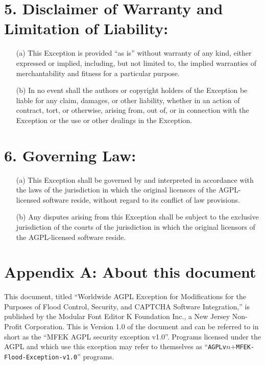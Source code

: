 \documentclass[12pt]{article}
\begin{document}
\section*{5. Disclaimer of Warranty and Limitation of Liability:}
\begin{enumerate}
\item[(a)] This Exception is provided ``as is'' without warranty of any kind, either expressed or implied, including, but not limited to, the implied warranties of merchantability and fitness for a particular purpose.

\item[(b)] In no event shall the authors or copyright holders of the Exception be liable for any claim, damages, or other liability, whether in an action of contract, tort, or otherwise, arising from, out of, or in connection with the Exception or the use or other dealings in the Exception.
\end{enumerate}

\section*{6. Governing Law:}
\begin{enumerate}
\item[(a)] This Exception shall be governed by and interpreted in accordance with the laws of the jurisdiction in which the original licensors of the AGPL-licensed software reside, without regard to its conflict of law provisions.

\item[(b)] Any disputes arising from this Exception shall be subject to the exclusive jurisdiction of the courts of the jurisdiction in which the original licensors of the AGPL-licensed software reside.
\end{enumerate}

\section*{Appendix A: About this document}
This document, titled ``Worldwide AGPL Exception for Modifications for the Purposes of Flood Control, Security, and CAPTCHA Software Integration,'' is published by the Modular Font Editor K Foundation Inc., a New Jersey Non-Profit Corporation. This is Version 1.0 of the document and can be referred to in short as the ``MFEK AGPL security exception v1.0''. Programs licensed under the AGPL and which use this exception may refer to themselves as ``\texttt{AGPLv$n$$+$MFEK-Flood-Exception-v1.0}'' programs.
\end{document}
